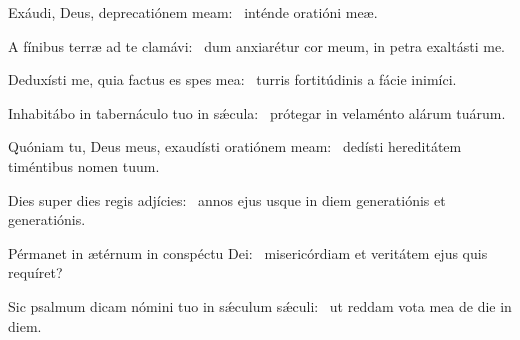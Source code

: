 \item Exáudi, Deus, deprecatiónem meam:~\psstar{} inténde oratióni meæ.

\item A fínibus terræ ad te clamávi:~\psstar{} dum anxiarétur cor meum, in petra exaltásti me.

\item Deduxísti me, quia factus es spes mea:~\psstar{} turris fortitúdinis a fácie inimíci.

\item Inhabitábo in tabernáculo tuo in sǽcula:~\psstar{} prótegar in velaménto alárum tuárum.

\item Quóniam tu, Deus meus, exaudísti oratiónem meam:~\psstar{} dedísti hereditátem timéntibus nomen tuum.

\item Dies super dies regis adjícies:~\psstar{} annos ejus usque in diem generatiónis et generatiónis.

\item Pérmanet in ætérnum in conspéctu Dei:~\psstar{} misericórdiam et veritátem ejus quis requíret?

\item Sic psalmum dicam nómini tuo in sǽculum sǽculi:~\psstar{} ut reddam vota mea de die in diem.
